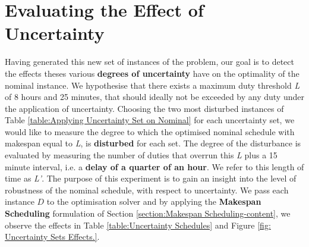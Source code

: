 
\section{Evaluating the Effect of Uncertainty}
\label{section: effect of uncertainty}
Having generated this new set of instances of the problem, our goal is to detect the effects theses various \textbf{degrees of uncertainty} have on the optimality of the nominal instance. We hypothesise that there exists a maximum duty threshold \textit{L} of 8 hours and 25 minutes, that should ideally not be exceeded by any duty under the application of uncertainty. Choosing the two most disturbed instances of Table \ref{table:Applying Uncertainty Set on Nominal} for each uncertainty set, we would like to measure the degree to which the optimised nominal schedule with makespan equal to \textit{L}, is \textbf{disturbed} for each set. The degree of the disturbance is evaluated by measuring the number of duties that overrun this \textit{L} plus a 15 minute interval, i.e. a \textbf{delay of a quarter of an hour}. We refer to this length of time as \textit{L'}. The purpose of this experiment is to gain an insight into the level of robustness of the nominal schedule, with respect to uncertainty. We pass each instance $D$ to the optimisation solver and by applying the \textbf{Makespan Scheduling} formulation of Section \ref{section:Makespan Scheduling-content}, we observe the effects in Table \ref{table:Uncertainty Schedules} and Figure \ref{fig: Uncertainty Sets Effects.}.


